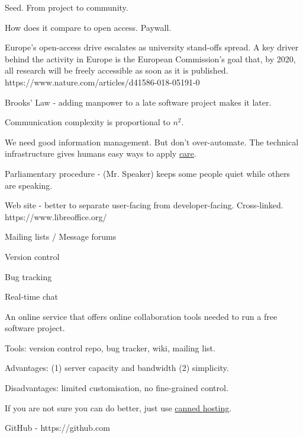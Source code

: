 \documentclass[landscape,30pt]{foils}
\begin{document}
Seed.  From project to community.


How does it compare to open access.  Paywall.

Europe’s open-access drive escalates as university stand-offs spread.  A key driver behind the activity in Europe is the European Commission’s goal that, by 2020, all research will be freely accessible as soon as it is published.  https://www.nature.com/articles/d41586-018-05191-0


Brooks' Law - adding manpower to a late software project makes it later. 

Communication complexity is proportional to $n^2$.

We need good information management.  But don't over-automate. The technical infrastructure gives humans easy ways to apply \underline{care}.

Parliamentary procedure -  (Mr. Speaker) keeps some people quiet while others are speaking.


Web site - better to separate user-facing from developer-facing. Cross-linked.  https://www.libreoffice.org/

Mailing lists / Message forums

Version control

Bug tracking

Real-time chat



An online service that offers online collaboration tools needed to run a free software project.

Tools: version control repo, bug tracker,  wiki, mailing list.

Advantages:  (1) server capacity and bandwidth (2) simplicity.

Disadvantages: limited customisation, no fine-grained control.
 
If you are not sure you can do better, just use \underline{canned hosting}.

GitHub - https://github.com
\end{document}
